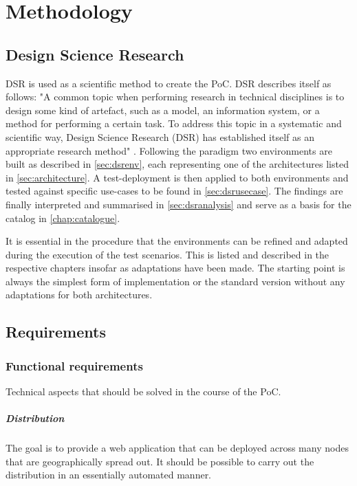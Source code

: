 \documentclass[MIC,Master,english]{twbook}%
\begin{document}
\pagebreak
\chapter{Methodology}
\label{sec:dsrmethode}
\section{Design Science Research}
\ac{DSR} is used as a scientific method to create the \ac{PoC}. \ac{DSR} describes itself as follows: "A common topic when performing research in technical disciplines is to design some kind of artefact, such as a model, an information system, or a method for performing a certain task. To address this topic in a systematic and scientific way, Design Science Research (DSR) has established itself as an appropriate research method" \cite{dsr-method}. Following the paradigm two environments are built as described in \autoref{sec:dsrenv}, each representing one of the architectures listed in \autoref{sec:architecture}. A test-deployment is then applied to both environments and tested against specific use-cases to be found in \autoref{sec:dsrusecase}. The findings are finally interpreted and summarised in \autoref{sec:dsranalysis} and serve as a basis for the catalog in \autoref{chap:catalogue}.\par
It is essential in the procedure that the environments can be refined and adapted during the execution of the test scenarios. This is listed and described in the respective chapters insofar as adaptations have been made. The starting point is always the simplest form of implementation or the standard version without any adaptations for both architectures.

\section{Requirements}

\subsection{Functional requirements}
Technical aspects that should be solved in the course of the \ac{PoC}.
\paragraph{Distribution} The goal is to provide a web application that can be deployed across many nodes that are geographically spread out. It should be possible to carry out the distribution in an essentially automated manner.
\end{document}
